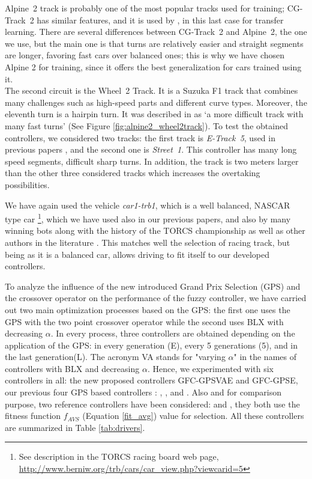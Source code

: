 \documentclass[10pt,journal,compsoc]{IEEEtran}
\begin{document}
\mbox{Alpine 2} track is probably one of the most popular tracks used for
training; \mbox{CG-Track 2} has similar features, and it is used by
\cite{mirus2019short,8833873,verma2018programmatically},
in this last case for transfer learning. There are several differences between \mbox{CG-Track 2} and \mbox{Alpine 2}, the one we use, but the main one is that turns are relatively easier and straight segments are longer, favoring fast cars over balanced ones; this is why we have chosen Alpine 2 for training, since
it offers the best generalization for cars trained using it.\\
The second circuit is the \mbox{Wheel 2} Track. It is a  Suzuka F1 track that combines many challenges such as  high-speed parts and different  curve types. Moreover, the eleventh turn is a hairpin turn. It was  described in \cite{wheel2track_chen} as `a more difficult track with many fast turns' (See Figure \ref{fig:alpine2_wheel2track}).
To test the obtained controllers, we considered two tracks: the first track is \mbox{\textit{E-Track 5}}, used in previous papers \cite{salem_evo17},\cite{salem_evo18} and the second one is \mbox{\textit{Street 1}}.
This controller has many long speed segments, difficult sharp turns. In addition, the track is two meters larger than the  other  three considered tracks which  increases the overtaking possibilities.

We have again used the vehicle \mbox{\textit{car1-trb1}},
which is a well balanced, NASCAR type car \footnote{See description in
  the TORCS racing board web page,
  \url{http://www.berniw.org/trb/cars/car_view.php?viewcarid=5}},
which we have used also in our previous papers, and also by many
winning bots  along with the history of the TORCS championship
\cite{torcs5} as well as other authors in the literature
\cite{auteur2010}. This matches well the selection
of racing track, but being as it is a balanced car, allows driving to
fit itself to our developed controllers.


To analyze the influence of the new introduced Grand Prix Selection
(GPS) and the crossover operator on the performance of the fuzzy
controller, we have carried out two main optimization processes based
on the GPS: the first one uses the GPS with the two point crossover
operator while the second uses  BLX with decreasing $\alpha$.
In every process, three controllers are obtained depending on the application of the GPS: in every generation (E), every 5 generations (5), and in the last generation(L). The acronym VA  stands for "varying $\alpha$" in the names of  controllers with BLX and decreasing $\alpha$.
Hence, we experimented with six controllers in all: the new
proposed controllers {\sf GFC-GPSVAE} and {\sf GFC-GPSE}, our previous four GPS based controllers \cite{DBLP:conf/cig/SalemMG19}: {}, {},{} and {}.
Also and for comparison purpose, two reference controllers have been considered: {}\cite{DBLP:conf/cig/SalemMG19} and {}\cite{salem_cig2018}, they both use the fitness function $f_{AVS}$ (Equation \ref{fit_avg}) value for selection.
All these controllers are summarized in Table \ref{tab:drivers}. 
\end{document}
